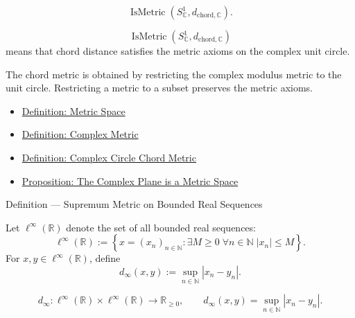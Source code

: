 \begin{remark*}
\[
  \operatorname{IsMetric}(S^1_{\mathbb{C}},d_{\mathrm{chord},\mathbb{C}}).
\]
\end{remark*}

\begin{remark*}
\[
\operatorname{IsMetric}(S^1_{\mathbb{C}},d_{\mathrm{chord},\mathbb{C}})
\]
means that chord distance satisfies the metric axioms on the complex unit
circle.
\end{remark*}

\begin{remark*}[Interpretation]
The chord metric is obtained by restricting the complex modulus metric to the
unit circle.  Restricting a metric to a subset preserves the metric axioms.
\end{remark*}


\begin{dependencies}
\begin{itemize}
  \item \hyperref[def:metric-space]{Definition: Metric Space}
  \item \hyperref[def:complex-metric]{Definition: Complex Metric}
  \item \hyperref[def:complex-circle-chord-metric]{Definition: Complex Circle Chord Metric}
  \item \hyperref[prop:complex-plane-metric-space]{Proposition: The Complex Plane is a Metric Space}
\end{itemize}
\end{dependencies}

\begin{definitionbox}{Definition --- Supremum Metric on Bounded Real Sequences}
\begin{definition}
\label{def:bounded-real-sequence-space}
Let \(\ell^\infty(\mathbb{R})\) denote the set of all bounded real sequences:
\[
  \ell^\infty(\mathbb{R})
  :=
  \left\{x=(x_n)_{n\in\mathbb{N}}:
  \exists M\geq 0\;\forall n\in\mathbb{N}\; |x_n|\leq M\right\}.
\]
For \(x,y\in\ell^\infty(\mathbb{R})\), define
\[
  d_\infty(x,y)
  :=
  \sup_{n\in\mathbb{N}} |x_n-y_n|.
\]
\end{definition}
\end{definitionbox}

\begin{remark*}
\[
d_\infty:
\ell^\infty(\mathbb{R})\times\ell^\infty(\mathbb{R})
\to
\mathbb{R}_{\geq 0},
\qquad
d_\infty(x,y)=\sup_{n\in\mathbb{N}} |x_n-y_n|.
\]
\end{remark*}

